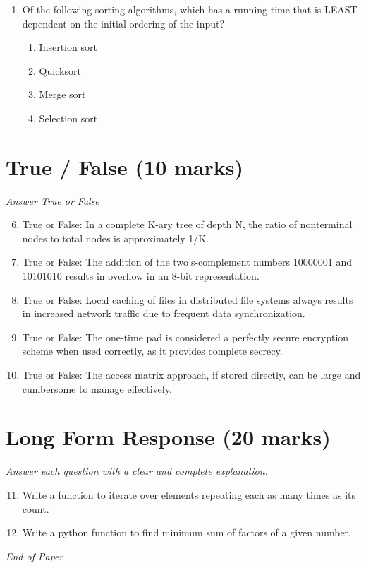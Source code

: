 \documentclass[12pt]{article}
\begin{document}
\begin{enumerate}[label=\arabic*.]
\begin{enumerate}[label=(\alph*)]
    \item It has not yet been proven, but finding a proof is a subject of active research.
    \item It can never be proven.
    \item It is now in doubt because of the advent of parallel computers.
\end{enumerate}
\item Of the following sorting algorithms, which has a running time that is LEAST dependent on
the initial ordering of the input?
\begin{enumerate}[label=(\alph*)]
    \item Insertion sort
    \item Quicksort
    \item Merge sort
    \item Selection sort
\end{enumerate}
\end{enumerate}

\section*{True / False (10 marks)}
\textit{Answer True or False}
\begin{enumerate}[label=\arabic*.]
\setcounter{enumi}{5}
\item True or False: In a complete K-ary tree of depth N, the ratio of nonterminal nodes to total nodes is approximately 1/K.
\item True or False: The addition of the two's-complement numbers 10000001 and 10101010 results in overflow in an 8-bit representation.
\item True or False: Local caching of files in distributed file systems always results in increased network traffic due to frequent data synchronization.
\item True or False: The one-time pad is considered a perfectly secure encryption scheme when used correctly, as it provides complete secrecy.
\item True or False: The access matrix approach, if stored directly, can be large and cumbersome to manage effectively.
\end{enumerate}

\section*{Long Form Response (20 marks)}
\textit{Answer each question with a clear and complete explanation.}
\begin{enumerate}[label=\arabic*.]
\setcounter{enumi}{10}
\item Write a function to iterate over elements repeating each as many times as its count.
\item Write a python function to find minimum sum of factors of a given number.
\end{enumerate}

\vfill
\noindent\textit{End of Paper}
\end{document}
